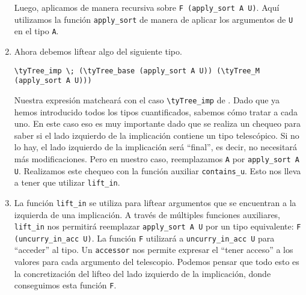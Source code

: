 \begin{enumerate}
    Luego, aplicamos \lift de manera recursiva sobre \lstinline{F (apply_sort A U)}. Aquí utilizamos la función \lstinline{apply_sort} de manera de aplicar los argumentos de \lstinline{U} en el tipo \lstinline{A}.
    \item Ahora debemos liftear algo del siguiente tipo.
    \begin{lstlisting}
\tyTree_imp \; (\tyTree_base (apply_sort A U)) (\tyTree_M (apply_sort A U)))
    \end{lstlisting}
    Nuestra expresión matcheará con el caso \lstinline{\tyTree_imp} de \lift. Dado que ya hemos introducido todos los tipos cuantificados, sabemos cómo tratar a cada uno. En este caso eso es muy importante dado que se realiza un chequeo para saber si el lado izquierdo de la implicación contiene un tipo telescópico. Si no lo hay, el lado izquierdo de la implicación será ``final'', es decir, no necesitará más modificaciones. Pero en nuestro caso, reemplazamos \lstinline{A} por \lstinline{apply_sort A U}. Realizamos este chequeo con la función auxiliar \lstinline{contains_u}. Esto nos lleva a tener que utilizar \lstinline{lift_in}.
    \item La función \lstinline{lift_in} se utiliza para liftear argumentos que se encuentran a la izquierda de una implicación.
    A través de múltiples funciones auxiliares, \lstinline{lift_in} nos permitirá reemplazar \lstinline{apply_sort A U} por un tipo equivalente: \lstinline{F (uncurry_in_acc U)}. La función \lstinline{F} utilizará a \lstinline{uncurry_in_acc U} para ``acceder'' al tipo. Un \lstinline{accessor} nos permite expresar el ``tener acceso'' a los valores para cada argumento del telescopio.
    Podemos pensar que todo esto es la concretización del lifteo del lado izquierdo de la implicación, donde conseguimos esta función \lstinline{F}.

\end{enumerate}
